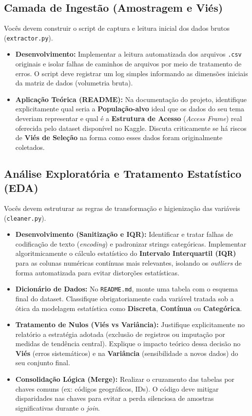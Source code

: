 \documentclass[12pt,a4paper]{article}
\begin{document}
	\subsection{Camada de Ingestão (Amostragem e Viés)}
	Vocês devem construir o script de captura e leitura inicial dos dados brutos (\texttt{extractor.py}).
	\begin{itemize}
		\item \textbf{Desenvolvimento:} Implementar a leitura automatizada dos arquivos \texttt{.csv} originais e isolar falhas de caminhos de arquivos por meio de tratamento de erros. O script deve registrar um log simples informando as dimensões iniciais da matriz de dados (volumetria bruta).
		\item \textbf{Aplicação Teórica (README):} Na documentação do projeto, identifique explicitamente qual seria a \textbf{População-alvo} ideal que os dados do seu tema deveriam representar e qual é a \textbf{Estrutura de Acesso} (\textit{Access Frame}) real oferecida pelo dataset disponível no Kaggle. Discuta criticamente se há riscos de \textbf{Viés de Seleção} na forma como esses dados foram originalmente coletados.
	\end{itemize}
	
	\subsection{Análise Exploratória e Tratamento Estatístico (EDA)}
	Vocês devem estruturar as regras de transformação e higienização das variáveis (\texttt{cleaner.py}).
	\begin{itemize}
		\item \textbf{Desenvolvimento (Sanitização e IQR):} Identificar e tratar falhas de codificação de texto (\textit{encoding}) e padronizar strings categóricas. Implementar algoritmicamente o cálculo estatístico do \textbf{Intervalo Interquartil (IQR)} para as colunas numéricas contínuas mais relevantes, isolando os \textit{outliers} de forma automatizada para evitar distorções estatísticas.
		\item \textbf{Dicionário de Dados:} No \texttt{README.md}, monte uma tabela com o esquema final do dataset. Classifique obrigatoriamente cada variável tratada sob a ótica da modelagem estatística como \textbf{Discreta}, \textbf{Contínua} ou \textbf{Categórica}.
		\item \textbf{Tratamento de Nulos (Viés vs Variância):} Justifique explicitamente no relatório a estratégia adotada (exclusão de registros ou imputação por medidas de tendência central). Explique o impacto teórico dessa decisão no \textbf{Viés} (erros sistemáticos) e na \textbf{Variância} (sensibilidade a novos dados) do seu conjunto final.
		\item \textbf{Consolidação Lógica (Merge):} Realizar o cruzamento das tabelas por chaves comuns (ex: códigos geográficos, IDs). O código deve mitigar disparidades nas chaves para evitar a perda silenciosa de amostras significativas durante o \textit{join}.
	\end{itemize}
	
\end{document}
